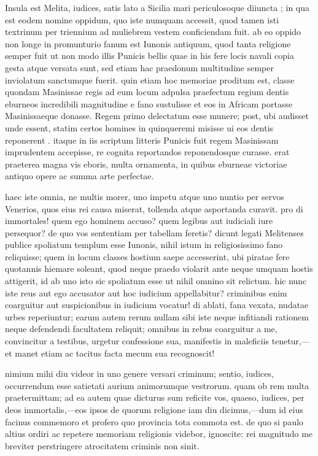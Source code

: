  Insula est Melita, iudices, satis lato a Sicilia mari periculosoque diiuncta ; in qua est eodem nomine oppidum, quo iste numquam accessit, quod tamen isti textrinum per triennium ad muliebrem vestem conficiendam fuit. ab eo oppido non longe in promunturio fanum est Iunonis antiquum, quod tanta religione semper fuit ut non modo illis Punicis bellis quae in his fere locis navali copia gesta atque versata sunt, sed etiam hac praedonum multitudine semper inviolatum sanctumque fuerit. quin etiam hoc memoriae proditum est, classe quondam Masinissae regis ad eum locum adpulsa praefectum regium dentis eburneos incredibili magnitudine e fano sustulisse et eos in Africam portasse Masinissaeque donasse. Regem primo delectatum esse munere; post, ubi audisset unde essent, statim certos homines in quinqueremi misisse ui eos dentis reponerent . itaque in iis scriptum litteris Punicis fuit regem Masinissam imprudentem accepisse, re cognita reportandos reponendosque curasse. erat praeterea magna vis eboris, multa ornamenta, in quibus eburneae victoriae antiquo opere ac summa arte perfectae.

 haec iste omnia, ne multis morer, uno impetu atque uno nuntio per servos Venerios, quos eius rei causa miserat, tollenda atque asportanda curavit. pro di immortales! quem ego hominem accuso? quem legibus aut iudiciali iure persequor? de quo vos sententiam per tabellam feretis? dicunt legati Melitenses publice spoliatum templum esse Iunonis, nihil istum in religiosissimo fano reliquisse; quem in locum classes hostium saepe accesserint, ubi piratae fere quotannis hiemare soleant, quod neque praedo violarit ante neque umquam hostis attigerit, id ab uno isto sic spoliatum esse ut nihil omnino sit relictum. hic nunc iste reus aut ego accusator aut hoc iudicium appellabitur? criminibus enim coarguitur aut suspicionibus in iudicium vocatur! di ablati, fana vexata, nudatae urbes reperiuntur; earum autem rerum nullam sibi iste neque infitiandi rationem neque defendendi facultatem reliquit; omnibus in rebus coarguitur a me, convincitur a testibus, urgetur confessione sua, manifestis in maleficiis tenetur,—et manet etiam ac tacitus facta mecum sua recognoscit!

 nimium mihi diu videor in uno genere versari criminum; sentio, iudices, occurrendum esse satietati aurium animorumque vestrorum. quam ob rem multa praetermittam; ad ea autem quae dicturus sum reficite vos, quaeso, iudices, per deos immortalis,—eos ipsos de quorum religione iam diu dicimus,—dum id eius facinus commemoro et profero quo provincia tota commota est. de quo si paulo altius ordiri ac repetere memoriam religionis videbor, ignoscite: rei magnitudo me breviter perstringere atrocitatem criminis non sinit.

